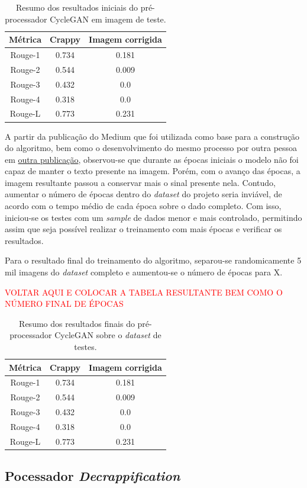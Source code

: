 \begin{table}[H]
  \centering
  \caption{Resumo dos resultados iniciais do pré-processador CycleGAN em imagem de teste.}
  \begin{tabular}{|c|c|c|}
    \hline
      \textbf{Métrica}  &
      \textbf{Crappy}  &
      \textbf{Imagem corrigida} \\
    \hline
      Rouge-1  &
      0.734 &
      0.181 \\
    \hline
      Rouge-2  &
      0.544 &
      0.009 \\
    \hline
      Rouge-3  &
      0.432 &
      0.0 \\
    \hline
      Rouge-4  &
      0.318 &
      0.0 \\
    \hline
      Rouge-L &
      0.773 &
      0.231 \\
    \hline
  \end{tabular}
  \label{tab:first-cycle-gan-rouge-n}
\end{table}

A partir da publicação do Medium que foi utilizada como base para a construção do algoritmo, bem como o desenvolvimento do mesmo processo por outra pessoa em \href{https://medium.com/towards-artificial-intelligence/cyclegan-as-a-denoising-engine-for-ocr-images-8d2a4988f769}{outra publicação}, observou-se que durante as épocas iniciais o modelo não foi capaz de manter o texto presente na imagem. Porém, com o avanço das épocas, a imagem resultante passou a conservar mais o sinal presente nela. Contudo, aumentar o número de épocas dentro do \textit{dataset} do projeto seria inviável, de acordo com o tempo médio de cada época sobre o dado completo. Com isso, iniciou-se os testes com um \textit{sample} de dados menor e mais controlado, permitindo assim que seja possível realizar o treinamento com mais épocas e verificar os resultados.

Para o resultado final do treinamento do algoritmo, separou-se randomicamente 5 mil imagens do \textit{dataset} completo e aumentou-se o número de épocas para X.

\textcolor{red}{VOLTAR AQUI E COLOCAR A TABELA RESULTANTE BEM COMO O NÚMERO FINAL DE ÉPOCAS}

\begin{table}[H]
  \centering
  \caption{Resumo dos resultados finais do pré-processador CycleGAN sobre o \textit{dataset} de testes.}
  \begin{tabular}{|c|c|c|}
    \hline
      \textbf{Métrica}  &
      \textbf{Crappy}  &
      \textbf{Imagem corrigida} \\
    \hline
      Rouge-1  &
      0.734 &
      0.181 \\
    \hline
      Rouge-2  &
      0.544 &
      0.009 \\
    \hline
      Rouge-3  &
      0.432 &
      0.0 \\
    \hline
      Rouge-4  &
      0.318 &
      0.0 \\
    \hline
      Rouge-L &
      0.773 &
      0.231 \\
    \hline
  \end{tabular}
  \label{tab:cycle-gan-rouge-n-result}
\end{table}

\subsection{Pocessador \textit{Decrappification}}